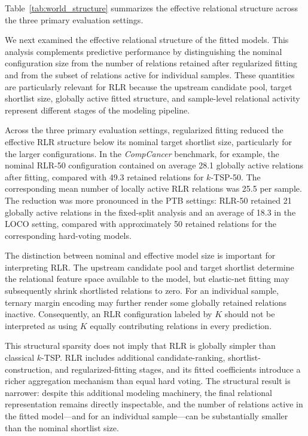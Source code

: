 \documentclass[journal]{IEEEtran}
\begin{document}
Table~\ref{tab:world_structure} summarizes the effective relational structure across the three primary evaluation settings.

We next examined the effective relational structure of the fitted models. This analysis complements predictive performance by distinguishing the nominal configuration size from the number of relations retained after regularized fitting and from the subset of relations active for individual samples. These quantities are particularly relevant for RLR because the upstream candidate pool, target shortlist size, globally active fitted structure, and sample-level relational activity represent different stages of the modeling pipeline.

Across the three primary evaluation settings, regularized fitting reduced the effective RLR structure below its nominal target shortlist size, particularly for the larger configurations. In the \emph{CompCancer} benchmark, for example, the nominal RLR-50 configuration contained on average 28.1 globally active relations after fitting, compared with 49.3 retained relations for $k$-TSP-50. The corresponding mean number of locally active RLR relations was 25.5 per sample. The reduction was more pronounced in the PTB settings: RLR-50 retained 21 globally active relations in the fixed-split analysis and an average of 18.3 in the LOCO setting, compared with approximately 50 retained relations for the corresponding hard-voting models.

The distinction between nominal and effective model size is important for interpreting RLR. The upstream candidate pool and target shortlist determine the relational feature space available to the model, but elastic-net fitting may subsequently shrink shortlisted relations to zero. For an individual sample, ternary margin encoding may further render some globally retained relations inactive. Consequently, an RLR configuration labeled by $K$ should not be interpreted as using $K$ equally contributing relations in every prediction.

This structural sparsity does not imply that RLR is globally simpler than classical $k$-TSP. RLR includes additional candidate-ranking, shortlist-construction, and regularized-fitting stages, and its fitted coefficients introduce a richer aggregation mechanism than equal hard voting. The structural result is narrower: despite this additional modeling machinery, the final relational representation remains directly inspectable, and the number of relations active in the fitted model---and for an individual sample---can be substantially smaller than the nominal shortlist size.
\end{document}
